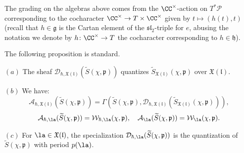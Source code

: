 \documentclass[12pt]{amsart}
\begin{document}
The grading on the algebras above comes from the $\CC^\times$-action on $T^*\mathcal{P}$ corresponding to the cocharacter $\CC^\times \rightarrow T \times \CC^\times$ given by $t \mapsto (h(t),t)$ (recall that $h \in \mathfrak{g}$ is the Cartan element of the $\mathfrak{sl}_2$-triple for $e$, abusing the notation we denote by $h\colon \CC^\times \rightarrow T$ the cocharacter corresponding to $h \in \mathfrak{h}$).








   
   
   
   The following proposition is standard.  %
   \begin{prop}\label{prop_quant_W_alg}
   $(a)$ The sheaf $\mathcal{D}_{\hbar,\mathfrak{X}(\mathfrak{l})}(\widetilde{S}(\chi,\mathfrak{p}))$ quantizes $\widetilde{S}_{\mathfrak{X}(\mathfrak{l})}(\chi,\mathfrak{p})$ over $\mathfrak{X}(\mathfrak{l})$.
   
   $(b)$ We have:
   \begin{equation*}
\mathcal{A}_{\hbar,\mathfrak{X}(\mathfrak{l})}(\widetilde{S}(\chi,\mathfrak{p}))=\Gamma(\widetilde{S}(\chi,\mathfrak{p}),\mathcal{D}_{\hbar,\mathfrak{X}(\mathfrak{l})}(\widetilde{S}_{\mathfrak{X}(\mathfrak{l})}(\chi,\mathfrak{p}))),
\end{equation*} 
\begin{equation*}
\mathcal{A}_{\hbar,\la}(\widetilde{S}(\chi,\mathfrak{p})) = \mathcal{W}_{\hbar,\la}(\chi,\mathfrak{p}), \quad \mathcal{A}_{\la}(\widetilde{S}(\chi,\mathfrak{p})) = \mathcal{W}_{\la}(\chi,\mathfrak{p}).
\end{equation*}

   $(c)$ For $\la \in \mathfrak{X}(\mathfrak{l})$, the specialization $\mathcal{D}_{\hbar,\la}(\widetilde{S}(\chi,\mathfrak{p}))$ is the quantization of $\widetilde{S}(\chi,\mathfrak{p})$ with period $p(\la)$.
   \end{prop}
\end{document}
